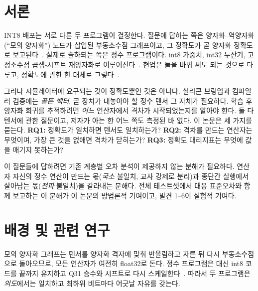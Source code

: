 \documentclass[journal]{IEEEtran}
\begin{document}
\section{서론}
INT8 배포는 서로 다른 두 프로그램이 결정한다. 질문에 답하는 쪽은 양자화--역양자화(``모의 양자화'') 노드가
삽입된 부동소수점 그래프이고, 그 정확도가 곧 양자화 정확도로 보고된다~\cite{jacob2018,krishnamoorthi2018}.
실제로 출하되는 쪽은 정수 프로그램이다. int8 가중치, int32 누산기, 고정소수점 곱셈-시프트 재양자화로
이루어진다~\cite{gemmlowp}. 현업은 둘을 바꿔 써도 되는 것으로 다루고, 정확도에 관한 한 대체로 그렇다~\cite{nagel2021}.

그러나 시뮬레이터에 요구되는 것이 정확도뿐인 것은 아니다. 실리콘 브링업과 컴파일러 검증에는 \emph{골든 벡터},
곧 장치가 내놓아야 할 정수 텐서 그 자체가 필요하다. 학습 후 양자화 회귀를 추적하려면 \emph{어느} 연산자에서
격차가 시작되었는지를 알아야 한다. 둘 다 텐서에 관한 질문이고, 저자가 아는 한 어느 쪽도 측정된 바 없다. 이
논문은 세 가지를 묻는다.
\textbf{RQ1:} 정확도가 일치하면 텐서도 일치하는가?
\textbf{RQ2:} 격차를 만드는 연산자는 무엇이며, 가장 큰 것을 없애면 격차가 닫히는가?
\textbf{RQ3:} 정확도 대리지표는 무엇에 값을 매기지 못하는가?

이 질문들에 답하려면 기존 계층별 오차 분석이 제공하지 않는 분해가 필요하다. 연산자 자신의 정수 연산이 만드는
몫(\emph{국소} 불일치, 교사 강제로 분리)과 종단간 실행에서 살아남는 몫(\emph{전파} 불일치)을 갈라내는
분해다. 전체 테스트셋에서 대응 표준오차와 함께 보고하는 이 분해가 이 논문의 방법론적 기여이고, 발견 1--6이
실험적 기여다.

\begin{table}[!t]
\caption{모의 양자화 대 비트 단위로 일치하는 정수 실행, 전체 테스트셋. \textsc{pc}는 채널별 가중치, \textsc{pt}는
텐서별 가중치. $\Delta$는 같은 이미지에서 잰 (정수 $-$ 모의) top-1이며 대응 표준오차를 함께 적었다.
``코드''는 서로 다른 출력 로짓 코드의 비율, ``이미지''는 코드가 하나라도 다른 이미지의 비율이다.}
\label{tab:fidelity}
\centering
\footnotesize

\end{table}

\section{배경 및 관련 연구}
모의 양자화 그래프는 텐서를 양자화 격자에 맞춰 반올림하고 자른 뒤 다시 부동소수점으로 돌아오므로, 모든 연산자가
여전히 float32로 돈다. 정수 프로그램은 대신 int8 코드를 끝까지 유지하고 Q31 승수와 시프트로 다시
스케일한다~\cite{jacob2018,gemmlowp}. 따라서 두 프로그램은 \emph{의도}에서는 일치하고 최하위 비트마다 어긋날
자유를 갖는다.
\end{document}
